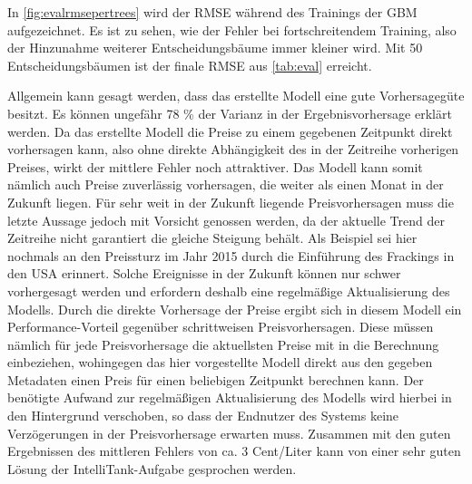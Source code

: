 \documentclass[
ngerman          %
,a4paper          %
,11pt
,pdftex
]{report}
\begin{document}
In \autoref{fig:evalrmsepertrees} wird der \ac{RMSE} während des Trainings der \acl{GBM} aufgezeichnet. Es ist zu sehen, wie der Fehler bei fortschreitendem Training, also der Hinzunahme weiterer Entscheidungsbäume immer kleiner wird. Mit 50 Entscheidungsbäumen ist der finale \ac{RMSE} aus \autoref{tab:eval} erreicht. \\
\par 

Allgemein kann gesagt werden, dass das erstellte Modell eine gute Vorhersagegüte besitzt. Es können ungefähr 78 \% der Varianz in der Ergebnisvorhersage erklärt werden. Da das erstellte Modell die Preise zu einem gegebenen Zeitpunkt direkt vorhersagen kann, also ohne direkte Abhängigkeit des in der Zeitreihe vorherigen Preises, wirkt der mittlere Fehler noch attraktiver. Das Modell kann somit nämlich auch Preise zuverlässig vorhersagen, die weiter als einen Monat in der Zukunft liegen. Für sehr weit in der Zukunft liegende Preisvorhersagen muss die letzte Aussage jedoch mit Vorsicht genossen werden, da der aktuelle Trend der Zeitreihe nicht garantiert die gleiche Steigung behält. Als Beispiel sei hier nochmals an den Preissturz im Jahr 2015 durch die Einführung des Frackings in den USA erinnert. Solche Ereignisse in der Zukunft können nur schwer vorhergesagt werden und erfordern deshalb eine regelmäßige Aktualisierung des Modells. Durch die direkte Vorhersage der Preise ergibt sich in diesem Modell ein Performance-Vorteil gegenüber schrittweisen Preisvorhersagen. Diese müssen nämlich für jede Preisvorhersage die aktuellsten Preise mit in die Berechnung einbeziehen, wohingegen das hier vorgestellte Modell direkt aus den gegeben Metadaten einen Preis für einen beliebigen Zeitpunkt berechnen kann. Der benötigte Aufwand zur regelmäßigen Aktualisierung des Modells wird hierbei in den Hintergrund verschoben, so dass der Endnutzer des Systems keine Verzögerungen in der Preisvorhersage erwarten muss. Zusammen mit den guten Ergebnissen des mittleren Fehlers von ca. 3 Cent/Liter kann von einer sehr guten Lösung der IntelliTank-Aufgabe gesprochen werden.
\end{document}
